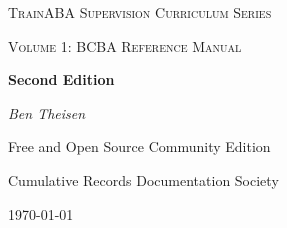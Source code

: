 \begin{titlepage}
	\centering
	{\scshape\LARGE TrainABA Supervision Curriculum Series\par}
	\vspace{1cm}
	{\scshape\Large Volume 1: BCBA Reference Manual\par}
	\vspace{1.5cm}
	{\huge\bfseries Second Edition\par}
	\vspace{2cm}
	{\Large\itshape Ben Theisen\par}
	\vfill
	Free and Open Source Community Edition \par   
	Cumulative Records Documentation Society

	\vfill

	{\large \today\par}
\end{titlepage}
